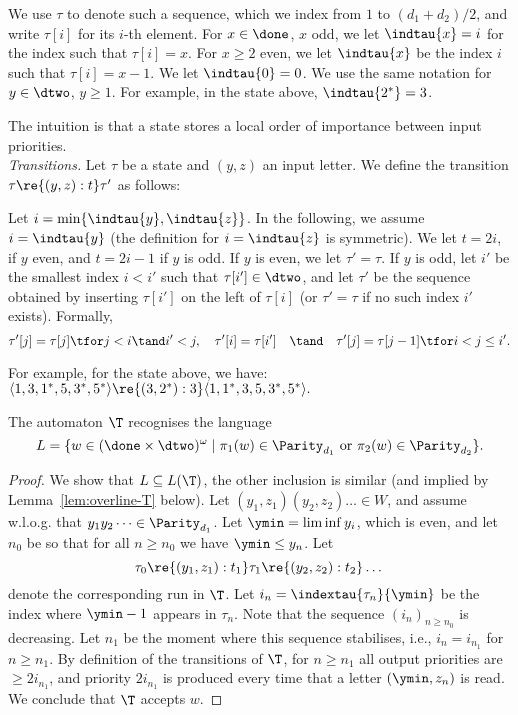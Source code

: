 We use $\tau$ to denote such a sequence, which we index from $1$ to $(d_1+d_2)/2$, and write $\tau[i]$ for its $i$-th element.
For $x\in \done$, $x$ odd,  we let $\indtau{x} = i$ for the index such that $\tau[i]=x$. For $x\geq 2$ even, we let $\indtau{x}$ be the index $i$ such that $\tau[i]=x-1$. We let $\indtau{0} = 0$. We use the same notation for $y\in \dtwo$, $y\geq 1$. For example, in the state above, $\indtau{2^*}=3$.

The intuition is that a state stores a local order of importance between input priorities.\\

\textit{Transitions.}
Let $\tau$ be a state and $(y,z)$ an input letter. We define the transition $\tau \re{(y,z):t}\tau'$ as follows:

Let $i = \min \{ \indtau{y}, \indtau{z}\}$. 
In the following, we assume $i = \indtau{y}$ (the definition for $i = \indtau{z}$ is symmetric). 
We let $t = 2i$, if $y$ even, and  $t = 2i-1$ if $y$ is odd.
If $y$ is even, we let $\tau' = \tau$.
If $y$ is odd, let $i'$ be the smallest index $i<i'$ such that $\tau[i']\in \dtwo$, and let $\tau'$ be the sequence obtained by inserting $\tau[i']$ on the left of $\tau[i]$ (or $\tau' = \tau$ if no such index $i'$ exists). 
Formally,
\[ \tau'[j] = \tau[j] \tfor j<i \tand i'<j,  \quad \tau'[i] = \tau[i'] \quad \tand \quad \tau'[j] = \tau[j-1] \tfor i<j\leq i' .\]

For example, for the state above, we have:
$ \langle 1,3,1^*, 5, 3^*, 5^* \rangle  \re{ (3,2^*):3} \langle 1, 1^*, 3, 5, 3^*, 5^* \rangle. $\\
\begin{lemma}\label{lem:language-of-T}
    The automaton $\T$ recognises the language \[L = \{w \in (\done \times \dtwo)^\omega \mid \pi_1(w) \in \Parity_{d_1} \ \mathrm{or} \ \pi_2(w) \in \Parity_{d_2}\}.\]
\end{lemma}
\begin{proof}
    We show that $L\subseteq L(\T)$, the other inclusion is similar (and implied by Lemma~\ref{lem:overline-T} below).
    Let $(y_1,z_1)(y_2,z_2)\dots \in W$, and assume w.l.o.g. that  $y_1y_2\dots \in \Parity_{d_1}$.
    Let $\ymin = \liminf y_i$, which is even, and let $n_0$ be so that for all $n \geq n_0$ we have $\ymin \leq y_n$.
    Let
    \[
        \tau_0 \re{(y_1,z_1):t_1} \tau_1 \re{(y_2,z_2):t_2} \dots
    \]
    denote the corresponding run in $\T$.
    Let $i_n = \indextau{\tau_n}{\ymin}$ be the index where $\ymin-1$ appears in $\tau_n$. 
    Note that the sequence $(i_n)_{n\geq n_0}$ is decreasing. %
    Let $n_1$ be the moment where this sequence stabilises, i.e., $i_n = i_{n_1}$ for $n\geq n_1$.
    By definition of the transitions of $\T$, for $n\geq n_1$ all output priorities are $\geq 2i_{n_1}$, and priority $2i_{n_1}$ is produced every time that a letter $(\ymin, z_n)$ is read.
    We conclude that $\T$ accepts $w$.
\end{proof}


